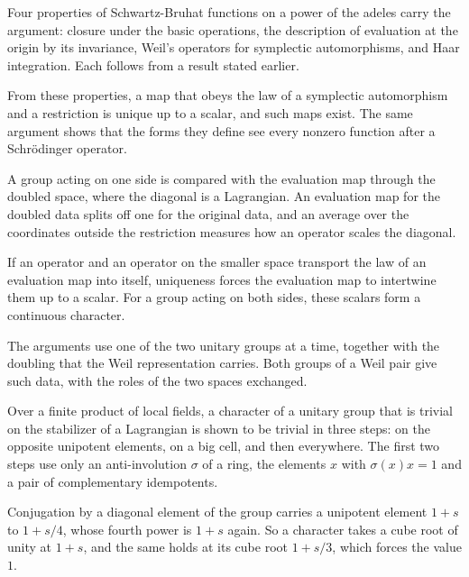 Four properties of Schwartz-Bruhat functions on a power of the adeles carry the
argument: closure under the basic operations, the description of evaluation at
the origin by its invariance, Weil's operators for symplectic automorphisms, and
Haar integration. Each follows from a result stated earlier.

From these properties, a map that obeys the law of a symplectic automorphism
and a restriction is unique up to a scalar, and such maps exist. The same
argument shows that the forms they define see every nonzero function after a
Schrödinger operator.

A group acting on one side is compared with the evaluation map through the
doubled space, where the diagonal is a Lagrangian. An evaluation map for the
doubled data splits off one for the original data, and an average over the
coordinates outside the restriction measures how an operator scales the
diagonal.

If an operator and an operator on the smaller space transport the law of an
evaluation map into itself, uniqueness forces the evaluation map to intertwine
them up to a scalar. For a group acting on both sides, these scalars form a
continuous character.

The arguments use one of the two unitary groups at a time, together with the
doubling that the Weil representation carries. Both groups of a Weil pair give
such data, with the roles of the two spaces exchanged.

Over a finite product of local fields, a character of a unitary group that is
trivial on the stabilizer of a Lagrangian is shown to be trivial in three
steps: on the opposite unipotent elements, on a big cell, and then everywhere.
The first two steps use only an anti-involution $\sigma$ of a ring, the
elements $x$ with $\sigma(x)x=1$ and a pair of complementary idempotents.

Conjugation by a diagonal element of the group carries a unipotent element
$1+s$ to $1+s/4$, whose fourth power is $1+s$ again. So a character takes a cube
root of unity at $1+s$, and the same holds at its cube root $1+s/3$, which forces
the value $1$.

